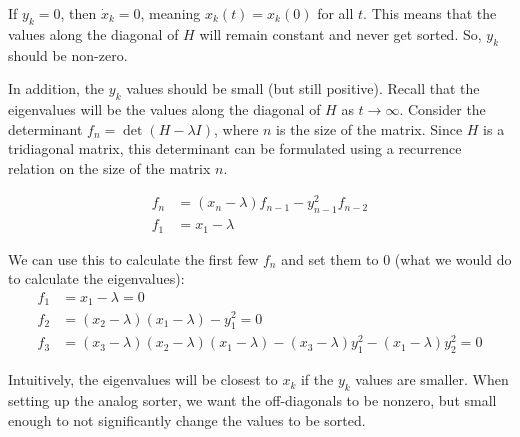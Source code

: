 If $y_k=0$, then $\dot x_k=0$, meaning $x_k(t) = x_k(0)$ for all $t$. This means that the values along the diagonal of $H$ will remain constant and never get sorted. So, $y_k$ should be non-zero.

In addition, the $y_k$ values should be small (but still positive). Recall that the eigenvalues will be the values along the diagonal of $H$ as $t\rightarrow \infty$. Consider the determinant $f_n = \det (H-\lambda I)$, where $n$ is the size of the matrix. Since $H$ is a tridiagonal matrix, this determinant can be formulated using a recurrence relation on the size of the matrix $n$.

\begin{align*}
f_n &= (x_n-\lambda)f_{n-1}-y_{n-1}^2f_{n-2} \\
f_1 &= x_1-\lambda
\end{align*}

We can use this to calculate the first few $f_n$ and set them to $0$ (what we would do to calculate the eigenvalues):
\begin{align*}
f_1 &= x_1-\lambda = 0\\
f_2 &= (x_2-\lambda)(x_1-\lambda)-y_1^2 = 0\\
f_3 &= (x_3-\lambda)(x_2-\lambda)(x_1-\lambda)-(x_3-\lambda)y_1^2-(x_1-\lambda)y^2_2 = 0
\end{align*}

Intuitively, the eigenvalues will be closest to $x_k$ if the $y_k$ values are smaller. When setting up the analog sorter, we want the off-diagonals to be nonzero, but small enough to not significantly change the values to be sorted. 






%
